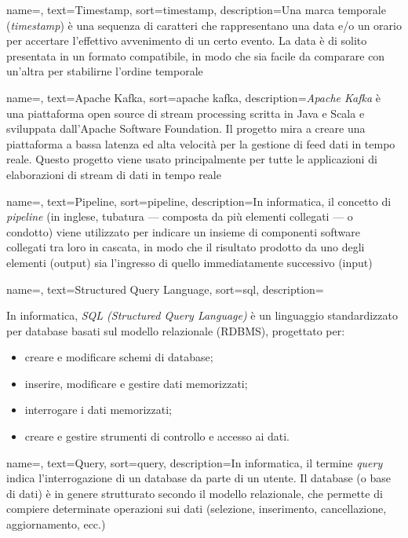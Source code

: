 {
    name=,
    text=Timestamp,
    sort=timestamp,
    description={Una marca temporale (\textit{timestamp}) è una sequenza di caratteri che rappresentano una data e/o un orario per accertare l'effettivo avvenimento di un certo evento. La data è di solito presentata in un formato compatibile, in modo che sia facile da comparare con un'altra per stabilirne l'ordine temporale}
}

{
    name=,
    text=Apache Kafka,
    sort=apache kafka,
    description={\textit{Apache Kafka} è una piattaforma open source di stream processing scritta in Java e Scala e sviluppata dall'Apache Software Foundation. Il progetto mira a creare una piattaforma a bassa latenza ed alta velocità per la gestione di feed dati in tempo reale. Questo progetto viene usato principalmente per tutte le applicazioni di elaborazioni di stream di dati in tempo reale}
}

{
    name=,
    text=Pipeline,
    sort=pipeline,
    description={In informatica, il concetto di \textit{pipeline} (in inglese, tubatura — composta da più elementi collegati — o condotto) viene utilizzato per indicare un insieme di componenti software collegati tra loro in cascata, in modo che il risultato prodotto da uno degli elementi (output) sia l'ingresso di quello immediatamente successivo (input)}
}

{
    name=,
    text=Structured Query Language,
    sort=sql,
    description={In informatica, \textit{SQL (Structured Query Language)} è un linguaggio standardizzato per database basati sul modello relazionale (RDBMS), progettato per:
    \begin{itemize}
    	\item{creare e modificare schemi di database;}
    	\item{inserire, modificare e gestire dati memorizzati;}
    	\item{interrogare i dati memorizzati;}
    	\item{creare e gestire strumenti di controllo e accesso ai dati.}
    \end{itemize}
    }
}

{
    name=,
    text=Query,
    sort=query,
    description={In informatica, il termine \textit{query} indica l'interrogazione di un database da parte di un utente. Il database (o base di dati) è in genere strutturato secondo il modello relazionale, che permette di compiere determinate operazioni sui dati (selezione, inserimento, cancellazione, aggiornamento, ecc.)}
}

